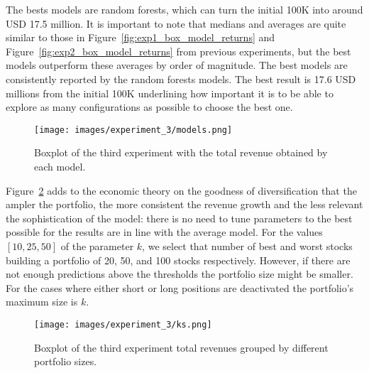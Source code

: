 The bests models are random forests, which can turn the initial 100K into around USD 17.5 million. It is important to note that medians and averages are quite similar to those in Figure~\ref{fig:exp1_box_model_returns} and Figure~\ref{fig:exp2_box_model_returns} from previous experiments, but the best models outperform these averages by order of magnitude. The best models are consistently reported by the random forests models. The best result is 17.6 USD millions from the initial 100K underlining how important it is to be able to explore as many configurations as possible to choose the best one. 



\begin{figure}
    \centering
    \texttt{[image: images/experiment\_3/models.png]}
    \caption{\small Boxplot of the third experiment with the total revenue obtained by each model. }
    \label{fig:exp3_box_model_returns}
\end{figure}


Figure~\ref{fig:exp3_box_ks_returns} adds to the  economic theory on the goodness of diversification that the ampler the portfolio, the more consistent the revenue growth and  the less relevant the sophistication of  the model: there is no need to tune parameters to the best possible for the results are in line with the average model. %
For the values $[10, 25, 50]$ of the parameter $k$, we select that number of best and worst stocks building a portfolio of 20, 50, and 100 stocks respectively. However, if there are not enough predictions above the thresholds the portfolio size might be smaller. For the cases where either short or long positions are deactivated the portfolio's maximum size is $k$.


\begin{figure}
    \centering
    \texttt{[image: images/experiment\_3/ks.png]}
    \caption{\small Boxplot of the third experiment total revenues grouped by different portfolio sizes.}
    \label{fig:exp3_box_ks_returns}
\end{figure}


